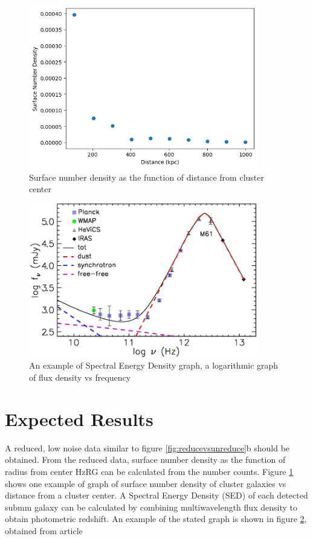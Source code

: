 \documentclass{article}
\begin{document}
\begin{figure}
    \centering
    \includegraphics[width=100mm]{SNDensity.png}
    \caption{Surface number density as the function of distance from cluster center}
    \label{fig:sndensity}
\end{figure}

\begin{figure}
    \centering
    \includegraphics[width=100mm]{SED.png}
    \caption{An example of Spectral Energy Density graph, a logarithmic graph of flux density vs frequency}
    \label{fig:sedgraph}
\end{figure}

\section{Expected Results}
A reduced, low noise data similar to figure \ref{fig:reducevsunreduce}b should be obtained. From the reduced data, surface number density as the function of radius from center HzRG can be calculated from the number counts. Figure \ref{fig:sndensity} shows one example of graph of surface number density of cluster galaxies vs distance from a cluster center. A Spectral Energy Density (SED) of each detected submm galaxy can be calculated by combining multiwavelength flux density to obtain photometric redshift. An example of the stated graph is shown in figure \ref{fig:sedgraph}, obtained from article \cite{Zotti2018}
\end{document}
